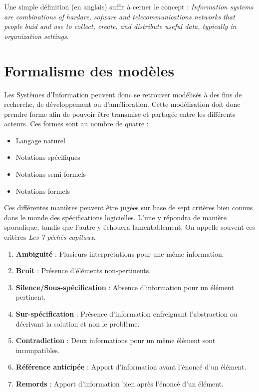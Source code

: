 Une simple définition (en anglais) suffit à cerner le concept : \textit{Information systems are combinations of hardare, sofware and telecommunications networks that people buid and use to collect, create, and distribute useful data, typically in organization settings}.

\section{Formalisme des modèles}

Les Systèmes d'Information peuvent donc se retrouver modélisés à des fins de recherche, de développement ou d'amélioration. Cette modélisation doit donc prendre forme afin de pouvoir être transmise et partagée entre les différents acteurs. Ces formes sont au nombre de quatre :

\begin{itemize}
  \item Langage naturel
  \item Notations spécifiques
  \item Notations semi-formels
  \item Notations formels
\end{itemize}

Ces différentes manières peuvent être jugées sur base de sept critères bien connus dans le monde des spécifications logicielles. L'une y répondra de manière sporadique, tandis que l'autre y échouera lamentablement. On appelle souvent ces critères \textit{Les 7 péchés capitaux}.

\begin{enumerate}
  \item \textbf{Ambiguité} : Plusieurs interprétations pour une même information.
  \item \textbf{Bruit} : Présence d'éléments non-pertinents.
  \item \textbf{Silence/Sous-spécification} : Absence d'information pour un élément pertinent.
  \item \textbf{Sur-spécification} : Présence d'information enfreignant l'abstraction ou décrivant la solution et non le problème.
  \item \textbf{Contradiction} : Deux informations pour un même élément sont incompatibles.
  \item \textbf{Référence anticipée} : Apport d'information avant l'énoncé d'un élément.
  \item \textbf{Remords} : Apport d'information bien après l'énoncé d'un élément.
\end{enumerate}

